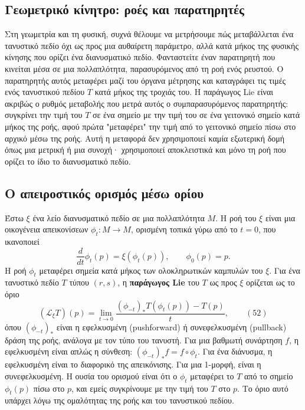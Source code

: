\documentclass[12pt]{article}
\begin{document}
\subsection{Γεωμετρικό κίνητρο: ροές και παρατηρητές}

Στη γεωμετρία και τη φυσική, συχνά θέλουμε να μετρήσουμε πώς μεταβάλλεται ένα τανυστικό πεδίο όχι ως προς μια αυθαίρετη παράμετρο, αλλά κατά μήκος της φυσικής κίνησης που ορίζει ένα διανυσματικό πεδίο. Φανταστείτε έναν παρατηρητή που κινείται μέσα σε μια πολλαπλότητα, παρασυρόμενος από τη ροή ενός ρευστού. Ο παρατηρητής αυτός μεταφέρει μαζί του όργανα μέτρησης και καταγράφει τις τιμές ενός τανυστικού πεδίου $T$ κατά μήκος της τροχιάς του. Η παράγωγος Lie είναι ακριβώς ο ρυθμός μεταβολής που μετρά αυτός ο συμπαρασυρόμενος παρατηρητής: συγκρίνει την τιμή του $T$ σε ένα σημείο με την τιμή του σε ένα γειτονικό σημείο κατά μήκος της ροής, αφού πρώτα "μεταφέρει" την τιμή από το γειτονικό σημείο πίσω στο αρχικό μέσω της ροής. Αυτή η μεταφορά δεν χρησιμοποιεί καμία εξωτερική δομή όπως μια μετρική ή μια συνοχή· χρησιμοποιεί αποκλειστικά και μόνο τη ροή που ορίζει το ίδιο το διανυσματικό πεδίο.

\subsection{Ο απειροστικός ορισμός μέσω ορίου}

Έστω $\xi$ ένα λείο διανυσματικό πεδίο σε μια πολλαπλότητα $M$. Η ροή του $\xi$ είναι μια οικογένεια απεικονίσεων $\phi_t: M \to M$, ορισμένη τοπικά γύρω από το $t=0$, που ικανοποιεί
\[
\frac{d}{dt} \phi_t(p) = \xi(\phi_t(p)), \qquad \phi_0(p) = p.
\]
Η ροή $\phi_t$ μεταφέρει σημεία κατά μήκος των ολοκληρωτικών καμπυλών του $\xi$. Για ένα τανυστικό πεδίο $T$ τύπου $(r, s)$, η \textbf{παράγωγος Lie} του $T$ ως προς $\xi$ ορίζεται ως το όριο
\begin{equation}
(\mathcal{L}_\xi T)(p) = \lim_{t \to 0} \frac{(\phi_{-t})_* T(\phi_t(p)) - T(p)}{t}, \qquad (52)
\end{equation}
όπου $(\phi_{-t})_*$ είναι η εφελκυσμένη (pushforward) ή συνεφελκυσμένη (pullback) δράση της ροής, ανάλογα με τον τύπο του τανυστή. Για μια βαθμωτή συνάρτηση $f$, η εφελκυσμένη είναι απλώς η σύνθεση: $(\phi_{-t})_* f = f \circ \phi_t$. Για ένα διάνυσμα, η εφελκυσμένη είναι το διαφορικό της απεικόνισης. Για μια 1-μορφή, είναι η συνεφελκυσμένη. Η ουσία του ορισμού είναι ότι ο $\phi_t$ μεταφέρει το $T$ από το σημείο $\phi_t(p)$ πίσω στο $p$, και εμείς συγκρίνουμε με την τιμή του $T$ στο $p$. Το όριο αυτό υπάρχει λόγω της ομαλότητας της ροής και του τανυστικού πεδίου.
\end{document}
